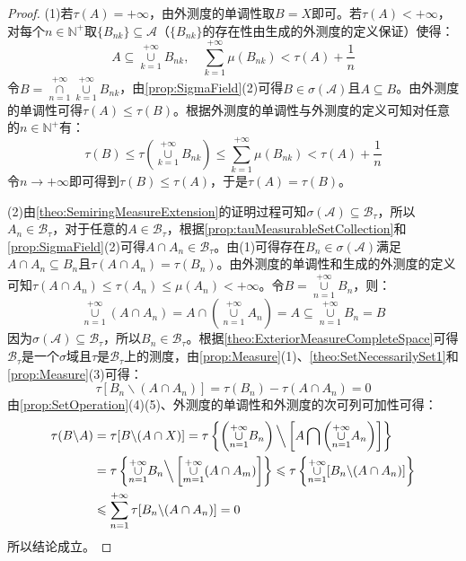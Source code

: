 \begin{proof}
	(1)若$\tau(A)=+\infty$，由外测度的单调性取$B=X$即可。若$\tau(A)<+\infty$，对每个$n\in\mathbb{N}^+$取$\{B_{nk}\}\subseteq\mathscr{A}$（$\{B_{nk}\}$的存在性由生成的外测度的定义保证）使得：
	\begin{equation*}
		A\subseteq\underset{k=1}{\overset{+\infty}{\cup}}B_{nk},\quad\sum_{k=1}^{+\infty}\mu(B_{nk})<\tau(A)+\frac{1}{n}
	\end{equation*}
	令$B=\underset{n=1}{\overset{+\infty}{\cap}}\underset{k=1}{\overset{+\infty}{\cup}}B_{nk}$，由\cref{prop:SigmaField}(2)可得$B\in\sigma(\mathscr{A})$且$A\subseteq B$。由外测度的单调性可得$\tau(A)\leqslant\tau(B)$。根据外测度的单调性与外测度的定义可知对任意的$n\in\mathbb{N}^+$有：
	\begin{equation*}
		\tau(B)\leqslant\tau\left(\underset{k=1}{\overset{+\infty}{\cup}}B_{nk}\right)\leqslant\sum_{k=1}^{+\infty}\mu(B_{nk})<\tau(A)+\frac{1}{n}
	\end{equation*}
	令$n\to+\infty$即可得到$\tau(B)\leqslant\tau(A)$，于是$\tau(A)=\tau(B)$。\par
	(2)由\cref{theo:SemiringMeasureExtension}的证明过程可知$\sigma(\mathscr{A})\subseteq\mathscr{B}_\tau$，所以$A_n\in\mathscr{B}_\tau$，对于任意的$A\in\mathscr{B}_\tau$，根据\cref{prop:tauMeasurableSetCollection}和\cref{prop:SigmaField}(2)可得$A\cap A_n\in\mathscr{B}_\tau$。由(1)可得存在$B_n\in\sigma(\mathscr{A})$满足$A\cap A_n\subseteq B_n$且$\tau(A\cap A_n)=\tau(B_n)$。由外测度的单调性和生成的外测度的定义可知$\tau(A\cap A_n)\leqslant\tau(A_n)\leqslant\mu(A_n)<+\infty$。令$B=\underset{n=1}{\overset{+\infty}{\cup}}B_n$，则：
	\begin{equation*}
		\underset{n=1}{\overset{+\infty}{\cup}}(A\cap A_n)=A\cap\left(\underset{n=1}{\overset{+\infty}{\cup}}A_n\right)=A\subseteq\underset{n=1}{\overset{+\infty}{\cup}}B_n=B
	\end{equation*}
	因为$\sigma(\mathscr{A})\subseteq\mathscr{B}_\tau$，所以$B_n\in\mathscr{B}_\tau$。根据\cref{theo:ExteriorMeasureCompleteSpace}可得$\mathscr{B}_\tau$是一个$\sigma$域且$\tau$是$\mathscr{B}_\tau$上的测度，由\cref{prop:Measure}(1)、\cref{theo:SetNecessarilySet1}和\cref{prop:Measure}(3)可得：
	\begin{equation*}
		\tau[B_n\backslash (A\cap A_n)]=\tau(B_n)-\tau(A\cap A_n)=0
	\end{equation*}
	由\cref{prop:SetOperation}(4)(5)、外测度的单调性和外测度的次可列可加性可得：
	\begin{align*}
		\tau(B\backslash A)&=\tau[B\backslash(A\cap X)]=\tau\left\{\left(\underset{n=1}{\overset{+\infty}{\cup}}B_n\right)\Big\backslash\left[A\bigcap\left(\underset{n=1}{\overset{+\infty}{\cup}}A_n\right)\right]\right\} \\
		&=\tau\left\{\underset{n=1}{\overset{+\infty}{\cup}}B_n\Big\backslash\left[\underset{m=1}{\overset{+\infty}{\cup}}(A\cap A_m)\right]\right\}\leqslant\tau\left\{\underset{n=1}{\overset{+\infty}{\cup}}[B_n\backslash(A\cap A_n)]\right\} \\
		&\leqslant\sum_{n=1}^{+\infty}\tau[B_n\backslash(A\cap A_n)]=0
	\end{align*}
	所以结论成立。
\end{proof}

